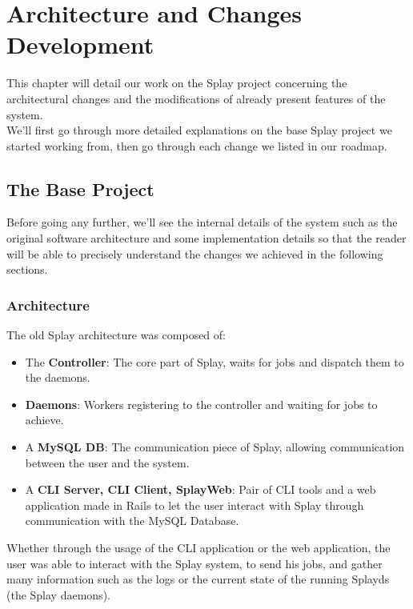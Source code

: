 \documentclass{eplmastersthesis}
\begin{document}
  \chapter{Architecture and Changes Development}

    This chapter will detail our work on the Splay project concerning the
    architectural changes and the modifications of already present features
    of the system.\\
    We'll first go through more detailed explanations on the base Splay
    project we started working from, then go through each change we listed
    in our roadmap.

    \section{The Base Project}

      Before going any further, we'll see the internal details of the system
      such as the original software architecture and some implementation
      details so that the reader will be able to precisely understand the
      changes we achieved in the following sections.

      \subsection{Architecture}

        The old Splay architecture was composed of:

        \begin{itemize}
          \item The \textbf{Controller}: The core part of Splay, waits for jobs
          and dispatch them to the daemons.
          \item \textbf{Daemons}: Workers registering to the controller and waiting
          for jobs to achieve.
          \item A \textbf{MySQL DB}: The communication piece of Splay, allowing
          communication between the user and the system.
          \item A \textbf{CLI Server, CLI Client, SplayWeb}: Pair of CLI tools
          and a web application made in Rails to let the user interact with
          Splay through communication with the MySQL Database.
        \end{itemize}

        Whether through the usage of the CLI application or the web application,
        the user was able to interact with the Splay system, to send his
        jobs, and gather many information such as the logs or the current
        state of the running Splayds (the Splay daemons).\\
\end{document}
